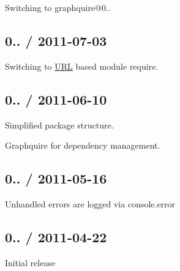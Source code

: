 \begin{DoxyItemize}
\item Switching to graphquire@0..
\end{DoxyItemize}

\subsection*{0.. / 2011-\/07-\/03}


\begin{DoxyItemize}
\item Switching to \mbox{\hyperlink{namespace_u_r_l}{U\+RL}} based module require.
\end{DoxyItemize}

\subsection*{0.. / 2011-\/06-\/10}


\begin{DoxyItemize}
\item Simplified package structure.
\item Graphquire for dependency management.
\end{DoxyItemize}

\subsection*{0.. / 2011-\/05-\/16}


\begin{DoxyItemize}
\item Unhandled errors are logged via console.\+error
\end{DoxyItemize}

\subsection*{0.. / 2011-\/04-\/22}


\begin{DoxyItemize}
\item Initial release 
\end{DoxyItemize}